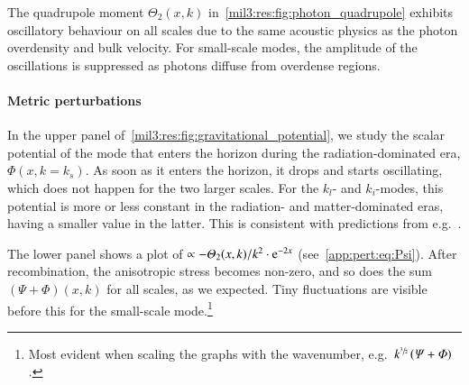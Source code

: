 

The quadrupole moment $\Theta_2(x,k)$ in~\cref{mil3:res:fig:photon_quadrupole} exhibits oscillatory behaviour on all scales due to the same acoustic physics as the photon overdensity and bulk velocity. For small-scale modes, the amplitude of the oscillations is suppressed as photons diffuse from overdense regions.


\paragraph{Metric perturbations}
In the upper panel of~\cref{mil3:res:fig:gravitational_potential}, we study the scalar potential of the mode that enters the horizon during the radiation-dominated era, $\Phi(x,k\!=\!k_s)$. As soon as it enters the horizon, it drops and starts oscillating, which does not happen for the two larger scales. For the $k_l$- and $k_i$-modes, this potential is more or less constant in the radiation- and matter-dominated eras, having a smaller value in the latter. This is consistent with predictions from e.g.~\citet{Baumann}.

The lower panel shows a plot of $\propto -\Theta_2(x, k)/k^2\cdot \eu[-2x]$ (see~\cref{app:pert:eq:Psi}). After recombination, the anisotropic stress becomes non-zero, and so does the sum $\left(\Psi + \Phi\right)(x,k)$ for all scales, as we expected. Tiny fluctuations are visible before this for the small-scale mode.\footnote{Most evident when scaling the graphs with the wavenumber, e.g.~$k^{\sfrac{3}{2}} \left(\varPsi + \varPhi \right)$.}




